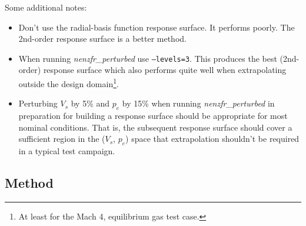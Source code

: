 Some additional notes:
\begin{itemize}
\item Don't use the radial-basis function response surface. It performs poorly. The 2nd-order response surface is a better method.
\item When running \textit{nenzfr\_perturbed} use \texttt{--levels=3}. This produces the best (2nd-order) response surface which also performs quite well when extrapolating outside the design domain\footnote{At least for the Mach 4, equilibrium gas test case.}.
\item Perturbing $V_s$ by 5\% and $p_e$ by 15\% when running \textit{nenzfr\_perturbed} in preparation for building a response surface should be appropriate for most nominal conditions. That is, the subsequent response surface should cover a sufficient region in the ($V_s$, $p_e$) space that extrapolation shouldn't be required in a typical test campaign.
\end{itemize}

\subsection{Method} \label{RS-methods}

